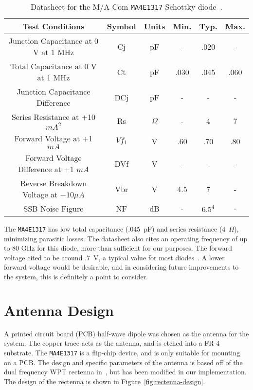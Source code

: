 \def\arraystretch{2}
\begin{table}[h!]
\centering
\begin{tabular}{|c|c|c|c|c|c|}
\hline
\textbf{Test Conditions} & \textbf{Symbol} & \textbf{Units} & \textbf{Min.} & \textbf{Typ.} & \textbf{Max.} \\ \hline
Junction Capacitance at 0 V at 1 MHz & Cj & pF & - & .020 & - \\ \hline
Total Capacitance at 0 V at 1 MHz & Ct & pF & .030 & .045 & .060 \\ \hline
Junction Capacitance Difference & DCj & pF & - & - & - \\ \hline
Series Resistance at +10 $mA^2$ & Rs & $\Omega$ & - & 4 & 7 \\ \hline
Forward Voltage at +1 $mA$ & $Vf_1$ & V & .60 & .70 & .80 \\ \hline
Forward Voltage Difference at +1 $mA$ & DVf & V & - & - & - \\ \hline
Reverse Breakdown Voltage at $-10 \mu A$ & Vbr & V & 4.5 & 7 & - \\ \hline
SSB Noise Figure & NF & dB & - & $6.5^4$ & - \\ \hline
\end{tabular}
\caption[Datasheet for diode used in rectenna construction]{Datasheet for the M/A-Com \texttt{MA4E1317} Schottky diode~\cite{ma4e1317-datasheet}.}
\label{tab:rectenna-datasheet}
\end{table}

The \texttt{MA4E1317} has low total capacitance (.045~pF) and series resistance (4~$\Omega$), minimizing parasitic losses. The datasheet also cites an operating frequency of up to 80 GHz for this diode, more than sufficient for our purposes. The forward voltage cited to be around .7~V, a typical value for most diodes~\cite{ma4e1317-datasheet}. A lower forward voltage would be desirable, and in considering future improvements to the system, this is definitely a point to consider.

\section{Antenna Design}
\label{sec:rectenna-antenna}

A printed circuit board (PCB) half-wave dipole was chosen as the antenna for the system. The copper trace acts as the antenna, and is etched into a FR-4 substrate. The \texttt{MA4E1317} is a flip-chip device, and is only suitable for mounting on a PCB. The design and specific parameters of the antenna is based off of the dual frequency WPT rectenna in~\cite{suh2002high}, but has been modified in our implementation. The design of the rectenna is shown in Figure~\ref{fig:rectenna-design}.


